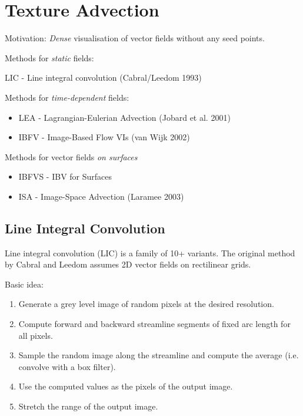 \section{Texture Advection}
Motivation: \emph{Dense} visualisation of vector fields without any seed points.

\begin{description}
\item Methods for \emph{static} fields:
    
    LIC - Line integral convolution (Cabral/Leedom 1993)
\item Methods for \emph{time-dependent} fields:
    \begin{itemize}
        \item LEA - Lagrangian-Eulerian Advection (Jobard et al. 2001)
        \item IBFV - Image-Based Flow VIs (van Wijk 2002)
    \end{itemize}
\item Methods for vector fields \emph{on surfaces}
    \begin{itemize}
        \item IBFVS - IBV for Surfaces
        \item ISA - Image-Space Advection (Laramee 2003)
    \end{itemize}

\end{description}

\subsection{Line Integral Convolution}
Line integral convolution (LIC) is a family of 10+ variants. The original method by Cabral and Leedom assumes 2D vector fields on rectilinear grids.

Basic idea:
\begin{enumerate}
    \item Generate a grey level image of random pixels at the desired resolution.
    \item Compute forward and backward streamline segments of fixed arc length for all pixels.
    \item Sample the random image along the streamline and compute the average (i.e. convolve with a box filter).
    \item Use the computed values as the pixels of the output image.
    \item Stretch the range of the output image.
\end{enumerate}

